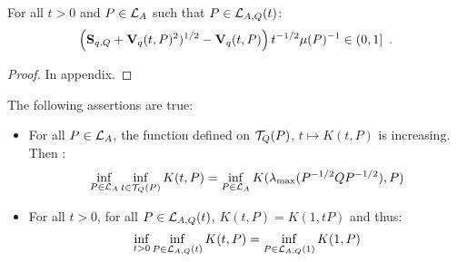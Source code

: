 \documentclass[10pt]{llncs}
\begin{document}
\begin{lemma}
\label{numerator}
For all $t>0$ and $P\in\mathcal{L}_{A}$ such that $P\in\mathcal{L}_{A,Q}(t)$: \[
\left(\mathbf{S}_{q,Q}+\mathbf{V}_{q}(t,P)^2)^{1/2}-\mathbf{V}_{q}(t,P)\right) t^{-1/2}\mu(P)^{-1}\in (0,1]\enspace .
\]
\end{lemma}
\begin{proof}
In appendix.
\end{proof}
%
%

\begin{prop}
\label{comp-prop}
The following assertions are true:
\begin{itemize}
\item For all $P\in\mathcal{L}_{A}$, the function defined on $\mathcal{T}_{Q}(P)$, $t\mapsto K(t,P)$ is increasing. Then : 
\begin{equation}
\label{infsolved}
\inf_{P\in\mathcal{L}_{A}} \inf_{t\in\mathcal{T}_{Q}(P)} K(t,P)=\inf_{P\in\mathcal{L}_{A}}K(\lambda_{\operatorname{max}}(P^{-1/2} Q P^{-1/2}),P)
\end{equation}
\item For all $t>0$, for all $P\in\mathcal{L}_{A,Q}(t)$, $K(t,P)=K(1,tP)$ and thus:
\[
\inf_{t>0} \inf_{P\in\mathcal{L}_{A,Q}(t)} K(t,P)=\inf_{P\in\mathcal{L}_{A,Q}(1)} K(1,P)
\]
\end{itemize}
\end{prop}
\end{document}
